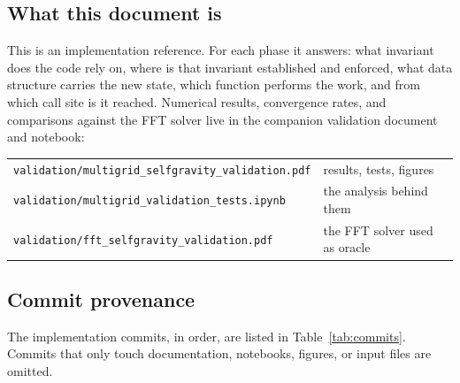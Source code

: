 \documentclass[11pt]{article}
\newcommand{\file}[1]{\texttt{\small #1}}
\begin{document}
\subsection{What this document is}

This is an implementation reference. For each phase it answers: what invariant does
the code rely on, where is that invariant established and enforced, what data
structure carries the new state, which function performs the work, and from which call
site is it reached. Numerical results, convergence rates, and comparisons against the
FFT solver live in the companion validation document and notebook:

\begin{center}
\begin{tabular}{@{}ll@{}}
\toprule
\file{validation/multigrid\_selfgravity\_validation.pdf} & results, tests, figures \\
\file{validation/multigrid\_validation\_tests.ipynb} & the analysis behind them \\
\file{validation/fft\_selfgravity\_validation.pdf} & the FFT solver used as oracle \\
\bottomrule
\end{tabular}
\end{center}

\subsection{Commit provenance}

The implementation commits, in order, are listed in Table~\ref{tab:commits}. Commits
that only touch documentation, notebooks, figures, or input files are omitted.
\end{document}
